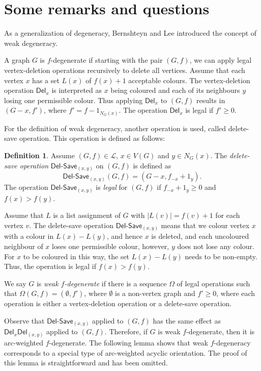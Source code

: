 \documentclass[11pt,a4paper]{article}
\theoremstyle{definition}
\newtheorem{definition}{Definition}
\newcommand{\dd}{\textsf{Del}}
\newcommand{\ed}{\textsf{Del}}
\newcommand{\ds}{\textsf{Del-Save}}
\begin{document}
 \section{Some remarks and questions}

As a generalization of degeneracy, Bernshteyn and Lee \cite{BL} introduced the concept of weak degeneracy. 
 
A graph  $G$ is  $f$-degenerate if starting with the pair $(G,f)$,
we can apply legal vertex-deletion operations recursively to delete all vertices. Assume that each vertex $x$ has a set $L(x)$ of $f(x)+1$ acceptable colours. The vertex-deletion operation $\dd_x$ is interpreted as $x$ being coloured and each of its neighbours $y$ losing one permissible colour. Thus applying $\dd_x$  to $(G,f)$ results in $(G-x, f')$, where $f' = f-1_{N_G(x)}$. The   operation $\dd_x$ is legal if $f' \ge 0$.  

For the definition of weak degeneracy, another operation is used, called delete-save operation. This operation is defined as follows:

		\begin{definition} 
		Assume $(G,f) \in \mathcal{L}$, $x \in V(G)$ and $y \in N_G(x)$. The {\em delete-save operation} $\ds_{(x,y)}$ on $(G,f)$ is defined as   
			$${\ds_{(x,y)}(G,f)=(G-x,f_{-x}+1_y). }$$ 
			The   operation $\ds_{(x,y)}$ is    {\em legal} for $(G,f)$ if $f_{-x} +1_y  \ge 0$  and  $f(x) > f(y)$.  
		\end{definition}

Assume that $L$ is a list assignment of $G$ with $|L(v)| = f(v)+1$ for each vertex $v$. The delete-save operation $\ds_{(x,y)}$ means that we colour vertex $x$ with a colour in $L(x) - L(y)$, and hence $x$ is deleted, and each uncoloured neighbour of $x$ loses one permissible colour, however,  $y$ does not lose any colour. For $x$ to be coloured in this way, the set $L(x) - L(y)$ needs to be non-empty. Thus, the operation is legal if $f(x) > f(y)$.

We say $G$ is \emph{weak $f$-degenerate} if there is a sequence $\Omega$ of legal operations such that $\Omega(G,f) = (\emptyset, f')$, where $\emptyset$ is a non-vertex graph and $f' \ge 0$, where each operation is either a vertex-deletion operation or a delete-save operation.  


Observe that $\ds_{(x,y)}$ applied to $(G,f)$ has the same effect as $\dd_x \ed_{(x,y)}$ applied to $(G,f)$. Therefore, if $G$ is weak $f$-degenerate, then it is arc-weighted  $f$-degenerate. The following lemma shows that weak  $f$-degeneracy corresponds to a special type of arc-weighted acyclic orientation. The proof of this lemma is straightforward and has been omitted.
\end{document}
